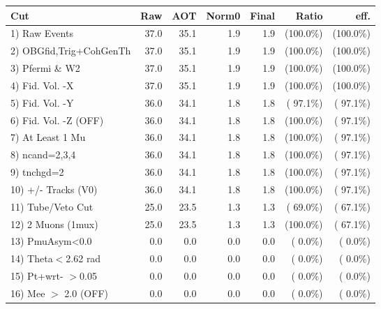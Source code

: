  \begin{table}[h!]\centering
 \begin{tabular}{||l||r|r|r|r|r|r||}
 \hline
 \hline
 Cut & Raw & AOT & Norm0 & Final & Ratio & eff.       \\
 \hline
  1) Raw Events           &         37.0 &         35.1 &          1.9 &          1.9 & (100.0\%) & (100.0\%) \\
  2) OBGfid,Trig+CohGenTh &         37.0 &         35.1 &          1.9 &          1.9 & (100.0\%) & (100.0\%) \\
  3) Pfermi \& W2         &         37.0 &         35.1 &          1.9 &          1.9 & (100.0\%) & (100.0\%) \\
  4) Fid. Vol. -X         &         37.0 &         35.1 &          1.9 &          1.9 & (100.0\%) & (100.0\%) \\
  5) Fid. Vol. -Y         &         36.0 &         34.1 &          1.8 &          1.8 & ( 97.1\%) & ( 97.1\%) \\
  6) Fid. Vol. -Z (OFF)   &         36.0 &         34.1 &          1.8 &          1.8 & (100.0\%) & ( 97.1\%) \\
  7) At Least 1 Mu        &         36.0 &         34.1 &          1.8 &          1.8 & (100.0\%) & ( 97.1\%) \\
  8) ncand=2,3,4          &         36.0 &         34.1 &          1.8 &          1.8 & (100.0\%) & ( 97.1\%) \\
  9) tnchgd=2             &         36.0 &         34.1 &          1.8 &          1.8 & (100.0\%) & ( 97.1\%) \\
 10) +/- Tracks (V0)      &         36.0 &         34.1 &          1.8 &          1.8 & (100.0\%) & ( 97.1\%) \\
 11) Tube/Veto Cut        &         25.0 &         23.5 &          1.3 &          1.3 & ( 69.0\%) & ( 67.1\%) \\
 12) 2 Muons (1mux)       &         25.0 &         23.5 &          1.3 &          1.3 & (100.0\%) & ( 67.1\%) \\
 13) PmuAsym<0.0          &          0.0 &          0.0 &          0.0 &          0.0 & (  0.0\%) & (  0.0\%) \\
 14) Theta$<$2.62 rad     &          0.0 &          0.0 &          0.0 &          0.0 & (  0.0\%) & (  0.0\%) \\
 15) Pt+wrt- $>$0.05      &          0.0 &          0.0 &          0.0 &          0.0 & (  0.0\%) & (  0.0\%) \\
 16) Mee $>$ 2.0  (OFF)   &          0.0 &          0.0 &          0.0 &          0.0 & (  0.0\%) & (  0.0\%) \\

\end{tabular}
\end{table}
